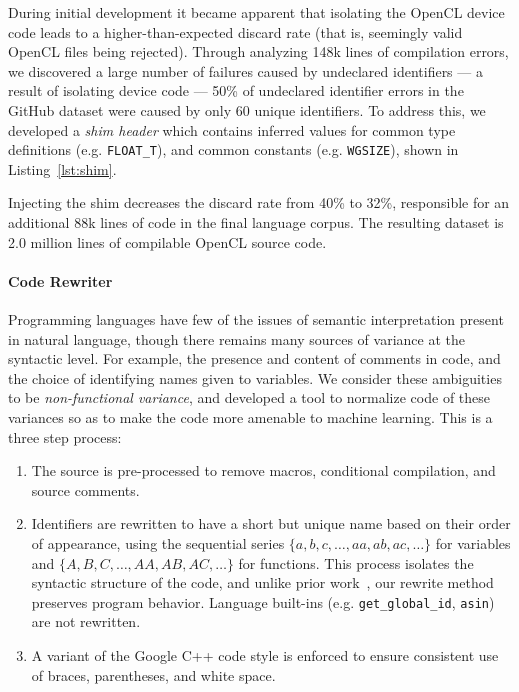 During initial development it became apparent that isolating the OpenCL device code leads to a higher-than-expected discard rate (that is, seemingly valid OpenCL files being rejected). Through analyzing 148k lines of compilation errors, we discovered a large number of failures caused by undeclared identifiers --- a result of isolating device code --- 50\% of undeclared identifier errors in the GitHub dataset were caused by only 60 unique identifiers. To address this, we developed a \emph{shim header} which contains inferred values for common type definitions (e.g. \texttt{FLOAT\_T}), and common constants (e.g. \texttt{WGSIZE}), shown in Listing~\ref{lst:shim}.

Injecting the shim decreases the discard rate from 40\% to 32\%, responsible for an additional 88k lines of code in the final language corpus. The resulting dataset is 2.0 million lines of compilable OpenCL source code.

\paragraph{Code Rewriter} Programming languages have few of the issues of semantic interpretation present in natural language, though there remains many sources of variance at the syntactic level. For example, the presence and content of comments in code, and the choice of identifying names given to variables. We consider these  ambiguities to be \emph{non-functional variance}, and developed a tool to normalize code of these variances so as to make the code more amenable to machine learning. This is a three step process: %
%
\begin{enumerate}
  \item The source is pre-processed to remove macros, conditional compilation, and source comments. %
  \item Identifiers are rewritten to have a short but unique name based on their order of appearance, using the sequential series $\{a,\allowbreak b,\allowbreak c,\allowbreak \ldots,\allowbreak aa,\allowbreak ab,\allowbreak ac,\allowbreak \ldots\}$ for variables and $\{A,\allowbreak B,\allowbreak C,\allowbreak \ldots,\allowbreak AA,\allowbreak AB,\allowbreak AC,\allowbreak \ldots\}$ for functions. This process isolates the syntactic structure of the code, and unlike prior work~\cite{Allamanis2013a}, our rewrite method preserves program behavior. Language built-ins (e.g. \texttt{get\_global\_id}, \texttt{asin}) are not rewritten.%
  \item A variant of the Google C++ code style is enforced to ensure consistent use of braces, parentheses, and white space.
\end{enumerate}


